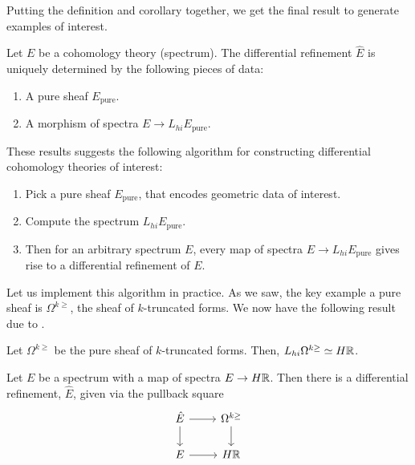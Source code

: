 \documentclass[10pt]{amsart}
\begin{document}
Putting the definition and corollary together, we get the final result to generate examples of interest.

\begin{corollary}
 Let $E$ be a cohomology theory (spectrum). The differential refinement $\hat{E}$ is uniquely determined by the following pieces of data:
\begin{enumerate}
  \item A pure sheaf $E_{\mathrm{pure}}$.
  \item A morphism of spectra $E \to L_{hi}E_{\mathrm{pure}}$.
\end{enumerate}
\end{corollary}

These results suggests the following algorithm for constructing differential cohomology theories of interest:
\begin{enumerate}
  \item Pick a pure sheaf $E_{\mathrm{pure}}$, that encodes geometric data of interest.
  \item Compute the spectrum $L_{hi}E_{\mathrm{pure}}$.
  \item Then for an arbitrary spectrum $E$, every map of spectra $E \to L_{hi}E_{\mathrm{pure}}$ gives rise to a differential refinement of $E$.
\end{enumerate}

Let us implement this algorithm in practice. As we saw, the key example a pure sheaf is $\Omega^{k \geq}$, the sheaf of $k$-truncated forms. We now have the following result due to \cite{bunkenikolausvoelkl2016diffcoh}.

\begin{theorem}
  Let $\Omega^{k \geq}$ be the pure sheaf of $k$-truncated forms. Then, $L_{hi}\Omega^{k \geq} \simeq H\mathbb{R}$. 
\end{theorem}

\begin{example}
 Let $E$ be a spectrum with a map of spectra $E \to H\mathbb{R}$. Then there is a differential refinement, $\hat{E}$, given via the pullback square 
 \[ 
 \begin{tikzcd}
 \hat{E} \arrow{r} \arrow{d} & \Omega^{k \geq}  \arrow{d} \\
 E \arrow{r} & H\bR
 \end{tikzcd}
 \]
\end{example}
\end{document}
